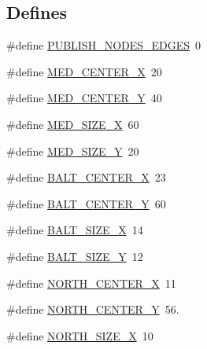 \subsection*{\-Defines}
\begin{DoxyCompactItemize}
\item 
\#define \hyperlink{a00016_a34379dd7ba936e396501b48e735a1b20_a34379dd7ba936e396501b48e735a1b20}{\-P\-U\-B\-L\-I\-S\-H\-\_\-\-N\-O\-D\-E\-S\-\_\-\-E\-D\-G\-E\-S}~0
\item 
\#define \hyperlink{a00016_ad85ab7068113dc84475cf30652874115_ad85ab7068113dc84475cf30652874115}{\-M\-E\-D\-\_\-\-C\-E\-N\-T\-E\-R\-\_\-\-X}~20
\item 
\#define \hyperlink{a00016_ae5ab8dd26396714a32a2a4ce7fc378f0_ae5ab8dd26396714a32a2a4ce7fc378f0}{\-M\-E\-D\-\_\-\-C\-E\-N\-T\-E\-R\-\_\-\-Y}~40
\item 
\#define \hyperlink{a00016_aab4929fd443830fa88546b2cb4e945a9_aab4929fd443830fa88546b2cb4e945a9}{\-M\-E\-D\-\_\-\-S\-I\-Z\-E\-\_\-\-X}~60
\item 
\#define \hyperlink{a00016_ac51d633b8a48950f88c946c1d175e25c_ac51d633b8a48950f88c946c1d175e25c}{\-M\-E\-D\-\_\-\-S\-I\-Z\-E\-\_\-\-Y}~20
\item 
\#define \hyperlink{a00016_a0da9666928ebcac616516774a85f7a1e_a0da9666928ebcac616516774a85f7a1e}{\-B\-A\-L\-T\-\_\-\-C\-E\-N\-T\-E\-R\-\_\-\-X}~23
\item 
\#define \hyperlink{a00016_a66530f0c393d2e538914b632edb59104_a66530f0c393d2e538914b632edb59104}{\-B\-A\-L\-T\-\_\-\-C\-E\-N\-T\-E\-R\-\_\-\-Y}~60
\item 
\#define \hyperlink{a00016_a14ccd5b0a841f759310f5d3b6208cf5a_a14ccd5b0a841f759310f5d3b6208cf5a}{\-B\-A\-L\-T\-\_\-\-S\-I\-Z\-E\-\_\-\-X}~14
\item 
\#define \hyperlink{a00016_a1c1e285f8b1a74ec8609e73b5ad4fd04_a1c1e285f8b1a74ec8609e73b5ad4fd04}{\-B\-A\-L\-T\-\_\-\-S\-I\-Z\-E\-\_\-\-Y}~12
\item 
\#define \hyperlink{a00016_adba9613a36cb7c246ce7d88c46fdb74c_adba9613a36cb7c246ce7d88c46fdb74c}{\-N\-O\-R\-T\-H\-\_\-\-C\-E\-N\-T\-E\-R\-\_\-\-X}~11
\item 
\#define \hyperlink{a00016_a09ebccefe21eeb37dbc59bb722a2e6eb_a09ebccefe21eeb37dbc59bb722a2e6eb}{\-N\-O\-R\-T\-H\-\_\-\-C\-E\-N\-T\-E\-R\-\_\-\-Y}~56.
\item 
\#define \hyperlink{a00016_a9adc5f9b5d673521744d30ca4c5e42c6_a9adc5f9b5d673521744d30ca4c5e42c6}{\-N\-O\-R\-T\-H\-\_\-\-S\-I\-Z\-E\-\_\-\-X}~10
\item 

\end{DoxyCompactItemize}
